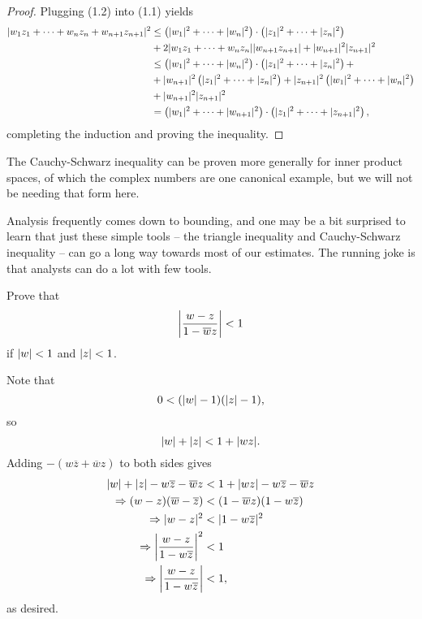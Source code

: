 \begin{proof}
	Plugging (1.2) into (1.1) yields
	\begin{align*}
		\lvert w_1z_1+\cdots+w_nz_n+w_{n+1}z_{n+1} \rvert^2 &\le \left(\lvert w_1 \rvert^2+\cdots+\lvert w_n \rvert^2\right) \cdot \left(\lvert z_1 \rvert^2+\cdots+\lvert z_n \rvert^2\right) \\&+2\lvert w_1z_1+\cdots+w_nz_n \rvert\lvert w_{n+1}z_{n+1} \rvert+\lvert w_{n+1} \rvert^2\lvert z_{n+1} \rvert^2 \\
		&\le \left(\lvert w_1 \rvert^2+\cdots+\lvert w_n \rvert^2\right) \cdot \left(\lvert z_1 \rvert^2+\cdots+\lvert z_n \rvert^2\right)+ \\ &+\lvert w_{n+1} \rvert^2\left(\lvert z_1 \rvert^2+\cdots+\lvert z_n \rvert^2\right)+\lvert z_{n+1} \rvert^2\left(\lvert w_1 \rvert^2+\cdots+\lvert w_n \rvert^2\right) \\ &+\lvert w_{n+1} \rvert^2\lvert z_{n+1} \rvert^2 \\
		&=\left(\lvert w_1 \rvert^2+\cdots+\lvert w_{n+1} \rvert^2\right) \cdot \left(\lvert z_1 \rvert^2+\cdots+\lvert z_{n+1} \rvert^2\right),
	\end{align*}
	completing the induction and proving the inequality.
\end{proof}

The Cauchy-Schwarz inequality can be proven more generally for inner product spaces, of which the complex numbers are one canonical example, but we will not be needing that form here.

Analysis frequently comes down to bounding, and one may be a bit surprised to learn that just these simple tools -- the triangle inequality and Cauchy-Schwarz inequality -- can go a long way towards most of our estimates. The running joke is that analysts can do a lot with few tools.

\begin{exercise}
	Prove that $$\left\lvert \dfrac{w-z}{1-\overline{w}z}\right \rvert<1$$ if $\lvert w \rvert<1$ and $\lvert z \rvert<1$.
	
	\begin{sol}
		Note that $$0<(\lvert w \rvert-1)(\lvert z \rvert-1),$$ so $$\lvert w \rvert+\lvert z \rvert<1+\lvert wz \rvert.$$ Adding $-(w\overline{z}+\overline{w}z)$ to both sides gives 
		\begin{align*}
		\lvert w \rvert+\lvert z \rvert-w\overline{z}-\overline{w}z &<1+\lvert wz \rvert-w\overline{z}-\overline{w}z \\
		\Rightarrow (w-z)(\overline{w}-\overline{z}) &<(1-\overline{w}z)(1-w\overline{z}) \\
		\Rightarrow \lvert w-z \rvert^2 &<\lvert 1-w\overline{z} \rvert^2 \\
		\Rightarrow \left\lvert \dfrac{w-z}{1-w\overline{z}}\right \rvert^2 &<1 \\
		\Rightarrow \left\lvert \dfrac{w-z}{1-w\overline{z}}\right \rvert &<1,
		\end{align*}
		as desired.
	\end{sol}
\end{exercise}


